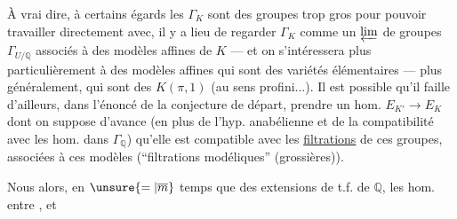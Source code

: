 À vrai dire, à certains égards les $\Gamma_K$ sont des groupes trop gros pour pouvoir travailler directement avec, il y a lieu de regarder $\Gamma_K$ comme un $\varprojlim$ de groupes $\Gamma_{U/\mathbb Q}$ associés à des modèles affines de $K$ --- et on s'intéressera plus particulièrement à des modèles affines qui sont des variétés élémentaires --- plus généralement, qui sont des $K(\pi,1)$ (au sens profini...). Il est possible qu'il faille d'ailleurs, dans l'énoncé de la conjecture de départ, prendre un hom.  $E_{K'}\longrightarrow E_K$ dont on suppose d'avance (en plus de l'hyp. anabélienne et de la compatibilité avec les hom. dans $\Gamma_{\mathbb Q}$) qu'elle est compatible avec les \uline{filtrations} de ces groupes, associées à ces modèles (``filtrations modéliques'' (grossières)).

Nous  alors, en $\unsure{=|\overline m}$ temps que des extensions de t.f. de $\mathbb Q$, les hom. entre , et
